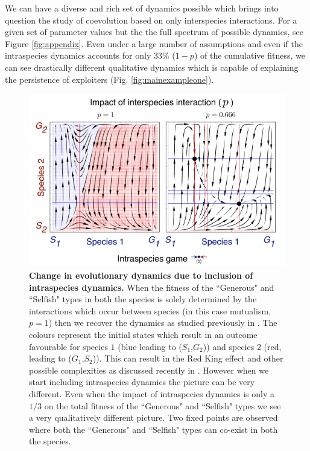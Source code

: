 \documentclass[12pt]{article}
\begin{document}
We can have a diverse and rich set of dynamics possible which brings into question the study of coevolution based on only interspecies interactions. 
For a given set of parameter values but the the full spectrum of possible dynamics, see Figure \ref{fig:appendix}.
Even under a large number of assumptions and even if the intraspecies dynamics accounts for only $33\%$ ($1-p$) of the cumulative fitness, we can see drastically different qualitative dynamics which is capable of explaining the persistence of exploiters (Fig. \ref{fig:mainexampleone}).

\begin{figure}
\begin{center}
\includegraphics[width=\columnwidth]{Figures/mainexample2.pdf}
\caption{\small{
\textbf{Change in evolutionary dynamics due to inclusion of intraspecies dynamics.} When the fitness of the ``Generous" and ``Selfish" types in both the species is solely determined by the interactions which occur between species (in this case mutualism, $p=1$) then we recover the dynamics as studied previously in \citep{gokhale:PRSB:2012}. The colours represent the initial states which result in an outcome favourable for species $1$ (blue leading to ($S_1$,$G_2$)) and species $2$ (red, leading to ($G_1$,$S_2$)). This can result in the Red King effect and other possible complexities as discussed recently in \citep{gao:SciRep:2015}. However when we start including intraspecies dynamics the picture can be very different.
Even when the impact of intraspecies dynamics is only a $1/3$ on the total fitness of the ``Generous" and ``Selfish" types we see a very qualitatively different picture.
Two fixed points are observed where both the ``Generous" and ``Selfish" types can co-exist in both the species.
}}
\end{center}
\end{figure}
\end{document}
